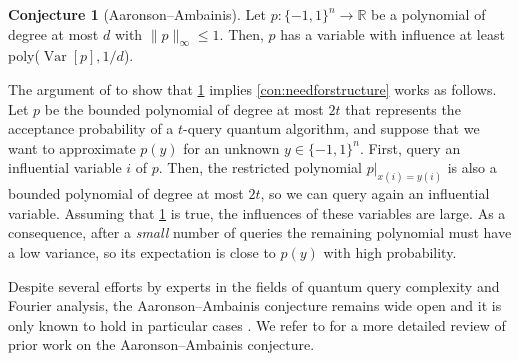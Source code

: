 \documentclass[11pt]{article}
\DeclareMathOperator{\var}{Var}
\newcommand{\norm}[1]{\|#1\|}
\newcommand{\1}{\mathbf{1}}
\theoremstyle{plain}
\theoremstyle{definition}
\newtheorem{conjecture}[theorem]{Conjecture}
\theoremstyle{remark}
\begin{document}
\begin{conjecture}[Aaronson--Ambainis]\label{con:AAconjecture}
	Let $p:\{-1,1\}^n\to \mathbb{R}$ be a polynomial of degree at most $d$ with $\norm{p}_\infty\leq 1$. Then, $p$ has a variable with influence at least poly($\var[p],1/d$).
\end{conjecture}

The argument of \cite[Theorem 22]{Aaronsons:2014} to show that \cref{con:AAconjecture} implies \cref{con:needforstructure} works as follows. Let $p$ be the bounded polynomial of degree at most $2t$ that represents the acceptance probability of a $t$-query quantum algorithm, and suppose that we want to approximate $p(y)$ for an unknown $y\in \{-1,1\}^n$. First, query an influential variable $i$ of $p$. Then, the restricted polynomial $p|_{x(i)=y(i)}$ is also a bounded polynomial of degree at most $2t$, so we can query again an influential variable. Assuming that \cref{con:AAconjecture} is true, the influences of these variables are large. As a consequence, after a \emph{small} number of queries the remaining polynomial must have a low variance, so its expectation is close to $p(y)$ with high probability. 

Despite several efforts by experts in the fields of quantum query complexity and Fourier analysis, the Aaronson--Ambainis conjecture remains wide open and it is only known to hold in particular cases \cite{montanaro2012some,o2015polynomial,defant2019fourier,lovett2022,Bansal:2022,gutierrez2023influences,bhattacharya2025random}. We refer to \cite{gutierrez2023influences} for a more detailed review of prior work on the Aaronson--Ambainis conjecture.
\end{document}
